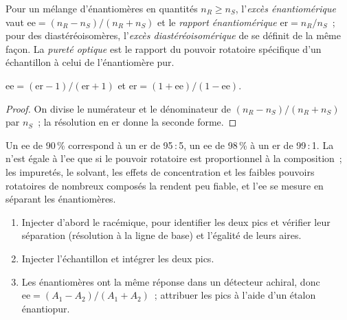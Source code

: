 \begin{definition}\label{def:b3:asymmetric-synthesis:ee}
Pour un mélange d'énantiomères en quantités $n_R \ge n_S$, l'\emph{excès énantiomérique} vaut $\mathrm{ee} = (n_R - n_S)/(n_R + n_S)$ et le \emph{rapport énantiomérique}
 $\mathrm{er} = n_R/n_S$~; pour des diastéréoisomères,
l'\emph{excès diastéréoisomérique} de se définit de la même
façon. La \emph{pureté optique} est le rapport du pouvoir
rotatoire spécifique d'un échantillon à celui de l'énantiomère pur.
\end{definition}

\begin{proposition}[ee et er]\label{prop:b3:asymmetric-synthesis:ee-er}
$\mathrm{ee} = (\mathrm{er} - 1)/(\mathrm{er} + 1)$ et $\mathrm{er} = (1 + \mathrm{ee})/(1 - \mathrm{ee})$.
\end{proposition}

\begin{proof}
On divise le numérateur et le dénominateur de $(n_R - n_S)/(n_R + n_S)$ par $n_S$~; la résolution
en er donne la seconde forme.
\end{proof}

Un ee de 90\,\% correspond à un er de 95\,:\,5, un ee de 98\,\% à un er de
99\,:\,1. La  n'est égale à l'ee que si le pouvoir rotatoire
est proportionnel à la composition~; les impuretés, le solvant, les effets
de concentration et les faibles pouvoirs rotatoires de nombreux composés la
rendent peu fiable, et l'ee se mesure en séparant les énantiomères.

\begin{method}\label{met:b3:asymmetric-synthesis:ee-chromatogram}
\begin{enumerate}
  \item Injecter d'abord le racémique, pour identifier les deux pics et
        vérifier leur séparation (résolution à la ligne de base) et
        l'égalité de leurs aires.
  \item Injecter l'échantillon et intégrer les deux pics.
  \item Les énantiomères ont la même réponse dans un détecteur achiral,
        donc
        $\mathrm{ee} = (A_1 - A_2)/(A_1 + A_2)$~; attribuer les pics à l'aide d'un étalon énantiopur.
\end{enumerate}
\end{method}

